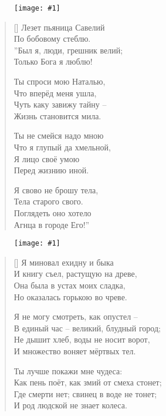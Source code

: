 \documentclass[12pt,a5paper,twoside]{article}
\newcommand{\pict}[1]{\thispagestyle{empty}\begin{figure}[H]\begin{center}\texttt{[image: \#1]}\end{center}\end{figure}\newpage}
\begin{document}
\pict{picts/Lezet_pianiza_Saveliy} 
%



\settowidth{\versewidth}{Лезет пьяница Савелий}
\begin{verse}[\versewidth]
Лезет пьяница Савелий\\
По бобовому стеблю.\\
”Был я, люди, грешник велий;\\
Только Бога я люблю!

Ты спроси мою Наталью,\\
Что вперёд меня ушла,\\
Чуть каку завижу тайну –\\
Жизнь становится мила.

Ты не смейся надо мною\\
Что я глупый да хмельной,\\
Я лицо своё умою\\
Перед жизнию иной.

Я свово не брошу тела,\\
Тела старого свого.\\
Поглядеть оно хотело\\
Агнца в городе Его!”
\end{verse}
\newpage



\pict{picts/Ya_minoval_exidnu_i_bika} 
%



\settowidth{\versewidth}{Я миновал ехидну и быка}
\begin{verse}[\versewidth]
Я миновал ехидну и быка\\
И книгу съел, растущую на древе,\\
Она была в устах моих сладка,\\
Но оказалась горькою во чреве.

Я не могу смотреть, как опустел –\\
В единый час – великий, блудный город;\\
Не дышит хлеб, воды не носит ворот,\\
И множество воняет мёртвых тел.

Ты лучше покажи мне чудеса:\\
Как пень поёт, как змий от смеха стонет;\\
Где смерти нет; свинец в воде не тонет;\\
И род людской не знает колеса.
\end{verse}
\newpage
\end{document}
